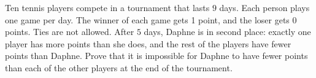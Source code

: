 Ten tennis players compete in a tournament that lasts $9$ days. Each person plays one game per day. The winner of each game gets 1 point, and the loser gets $0$ points. Ties are not allowed. After $5$ days, Daphne is in second place: exactly one player has more points than she does, and the rest of the players have fewer points than Daphne. Prove that it is impossible for Daphne to have fewer points than each of the other players at the end of the tournament.
